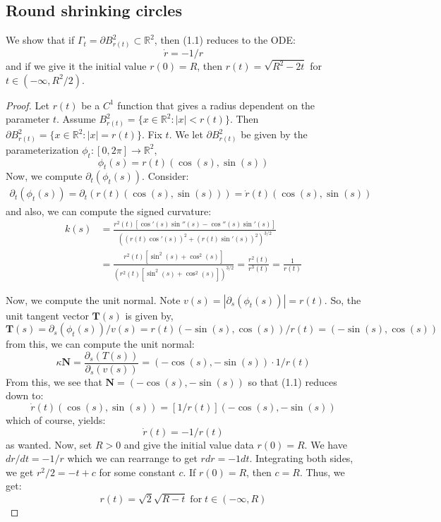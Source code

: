\documentclass{article}
\begin{document}
\subsection{Round shrinking circles}
We show that if $\Gamma_t = \partial B^2_{r(t)}\subset\mathbb{R}^2$, then (1.1) reduces to the ODE:
\[ \dot{r} = -1/r \]
and if we give it the initial value $r(0) = R$, then $r(t) = \sqrt{R^2 - 2t}$ for $t\in(-\infty,R^2/2)$.
\begin{proof}
    Let $r(t)$ be a $C^1$ function that gives a radius dependent on the parameter $t$.
    Assume $B^2_{r(t)} = \{x\in\mathbb{R}^2: |x|< r(t)\}$. Then $\partial B^2_{r(t)} = \{x\in\mathbb{R}^2:|x|=r(t)\}$.
    Fix $t$. We let $\partial B^2_{r(t)}$ be given by the parameterization $\phi_t: [0,2\pi]\to\mathbb{R}^2$,
    \[ \phi_t(s) = r(t)(\cos(s),\sin(s))\]
    Now, we compute $\partial_t(\phi_t(s))$. Consider:
    \begin{align*}
        \partial_t(\phi_t(s)) = \partial_t(r(t)(\cos(s),\sin(s))) = \dot{r}(t)(\cos(s),\sin(s))
    \end{align*}
    and also, we can compute the signed curvature:
    \begin{align*}
        k(s) &= \frac{r^2(t)[\cos'(s)\sin''(s)-\cos''(s)\sin'(s)]}{((r(t)\cos'(s))^2+(r(t)\sin'(s))^2)^{3/2}} \\
                   &= \frac{r^2(t)[\sin^2(s) + \cos^2(s)]}{(r^2(t)[\sin^2(s) + \cos^2(s)])^{3/2}} = \frac{r^2(t)}{r^3(t)} = \frac{1}{r(t)}
    \end{align*}

    Now, we compute the unit normal. Note $v(s) = |\partial_s(\phi_t(s))| = r(t)$. So, the unit tangent vector $\mathbf{T}(s)$ is given by,
    \[ \mathbf{T}(s) = \partial_s(\phi_t(s))/v(s) = r(t)(-\sin(s),\cos(s))/r(t) = (-\sin(s),\cos(s))\]
    from this, we can compute the unit normal:
    \[ \kappa\mathbf{N} = \frac{\partial_s(T(s))}{\partial_s(v(s))} = (-\cos(s),-\sin(s))\cdot 1/r(t)   \]
    From this, we see that $\mathbf{N} = (-\cos(s),-\sin(s))$ so that (1.1) reduces down to:
    \[ \dot{r}(t)(\cos(s),\sin(s))  = [1/r(t)](-\cos(s),-\sin(s)) \]
    which of course, yields:
    \[ \dot{r}(t) = -1/r(t) \]
    as wanted. Now, set $R > 0$ and give the initial value data $r(0) = R$. We have $dr/dt = -1/r$ which we can rearrange to get $r dr = -1 dt$.
    Integrating both sides, we get $r^2/2 = -t + c$ for some constant $c$. If $r(0) = R$, then $c = R$. Thus, we get:
    \[ r(t) = \sqrt{2}\sqrt{R-t} \;\text{for}\;t\in (-\infty, R)\]
\end{proof}
\end{document}
